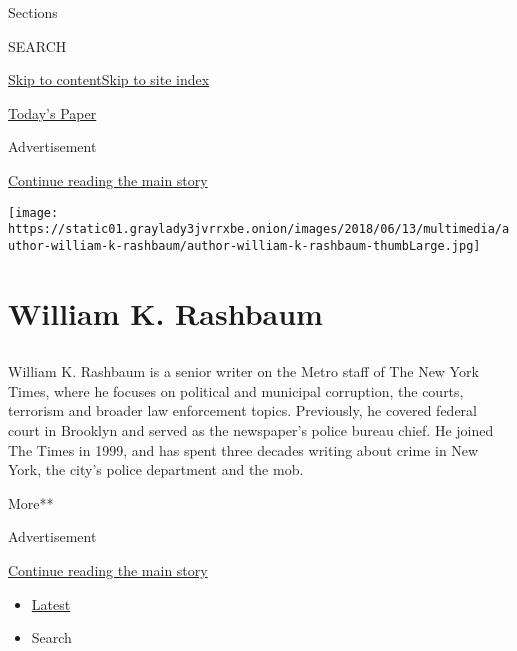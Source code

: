 Sections

SEARCH

\protect\hyperlink{site-content}{Skip to
content}\protect\hyperlink{site-index}{Skip to site index}

\href{https://myaccount.nytimes3xbfgragh.onion/auth/login?response_type=cookie\&client_id=vi}{}

\href{https://www.nytimes3xbfgragh.onion/section/todayspaper}{Today's
Paper}

Advertisement

\protect\hyperlink{after-top}{Continue reading the main story}

\texttt{[image: https://static01.graylady3jvrrxbe.onion/images/2018/06/13/multimedia/author-william-k-rashbaum/author-william-k-rashbaum-thumbLarge.jpg]}

\hypertarget{william-k-rashbaum}{%
\section{William K. Rashbaum}\label{william-k-rashbaum}}

\subsection{}

William K. Rashbaum is a senior writer on the Metro staff of The New
York Times, where he focuses on political and municipal corruption, the
courts, terrorism and broader law enforcement topics. Previously, he
covered federal court in Brooklyn and served as the newspaper's police
bureau chief. He joined The Times in 1999, and has spent three decades
writing about crime in New York, the city's police department and the
mob.

More**

Advertisement

\protect\hyperlink{after-mid1}{Continue reading the main story}

\begin{itemize}
\tightlist
\item
  \protect\hyperlink{stream-panel}{Latest}
\item
  Search
\end{itemize}

